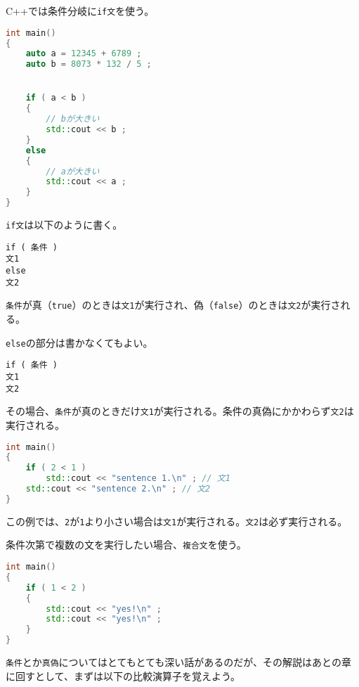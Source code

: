 C++では条件分岐に\texttt{if文}を使う。

\begin{lstlisting}[language={C++}]
int main()
{
    auto a = 12345 + 6789 ;
    auto b = 8073 * 132 / 5 ;


    if ( a < b )
    {
        // bが大きい
        std::cout << b ;
    }
    else
    {
        // aが大きい
        std::cout << a ;
    }
}
\end{lstlisting}

\texttt{if文}は以下のように書く。

\ifTombow\pagebreak\fi
\begin{lstlisting}[style=grammar]
if ( 条件 )
文1
else
文2
\end{lstlisting}

\texttt{条件}が真（\texttt{true}）のときは\texttt{文1}が実行され、偽（\texttt{false}）のときは\texttt{文2}が実行される。

\texttt{else}の部分は書かなくてもよい。

\begin{lstlisting}[style=grammar]
if ( 条件 )
文1
文2
\end{lstlisting}

その場合、\texttt{条件}が真のときだけ\texttt{文1}が実行される。条件の真偽にかかわらず\texttt{文2}は実行される。

\begin{lstlisting}[language={C++}]
int main()
{
    if ( 2 < 1 )
        std::cout << "sentence 1.\n" ; // 文1
    std::cout << "sentence 2.\n" ; // 文2
}
\end{lstlisting}

この例では、\texttt{2}が\texttt{1}より小さい場合は\texttt{文1}が実行される。\texttt{文2}は必ず実行される。

条件次第で複数の文を実行したい場合、\texttt{複合文}を使う。

\begin{lstlisting}[language={C++}]
int main()
{
    if ( 1 < 2 )
    {
        std::cout << "yes!\n" ;
        std::cout << "yes!\n" ;
    }
}
\end{lstlisting}

\texttt{条件}とか\texttt{真偽}についてはとてもとても深い話があるのだが、その解説はあとの章に回すとして、まずは以下の比較演算子を覚えよう。

